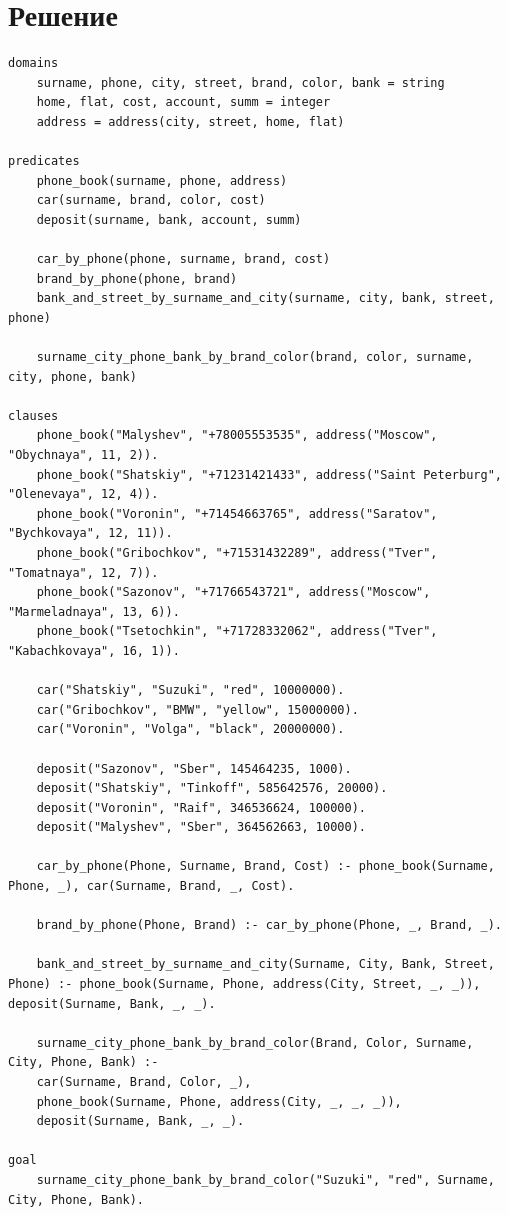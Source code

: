 \documentclass[12pt]{report}
\begin{document}
\newpage
\section*{Решение}
\begin{lstlisting}
domains
	surname, phone, city, street, brand, color, bank = string
	home, flat, cost, account, summ = integer
	address = address(city, street, home, flat)
		
predicates
	phone_book(surname, phone, address)
	car(surname, brand, color, cost)
	deposit(surname, bank, account, summ)
	
	car_by_phone(phone, surname, brand, cost)
	brand_by_phone(phone, brand)
	bank_and_street_by_surname_and_city(surname, city, bank, street, phone)
	
	surname_city_phone_bank_by_brand_color(brand, color, surname, city, phone, bank)
		
clauses
	phone_book("Malyshev", "+78005553535", address("Moscow", "Obychnaya", 11, 2)).
	phone_book("Shatskiy", "+71231421433", address("Saint Peterburg", "Olenevaya", 12, 4)).
	phone_book("Voronin", "+71454663765", address("Saratov", "Bychkovaya", 12, 11)).
	phone_book("Gribochkov", "+71531432289", address("Tver", "Tomatnaya", 12, 7)).
	phone_book("Sazonov", "+71766543721", address("Moscow", "Marmeladnaya", 13, 6)).
	phone_book("Tsetochkin", "+71728332062", address("Tver", "Kabachkovaya", 16, 1)).
	
	car("Shatskiy", "Suzuki", "red", 10000000).
	car("Gribochkov", "BMW", "yellow", 15000000).
	car("Voronin", "Volga", "black", 20000000).
	
	deposit("Sazonov", "Sber", 145464235, 1000).
	deposit("Shatskiy", "Tinkoff", 585642576, 20000).
	deposit("Voronin", "Raif", 346536624, 100000).
	deposit("Malyshev", "Sber", 364562663, 10000).
	
	car_by_phone(Phone, Surname, Brand, Cost) :- phone_book(Surname, Phone, _), car(Surname, Brand, _, Cost).
	
	brand_by_phone(Phone, Brand) :- car_by_phone(Phone, _, Brand, _).
	
	bank_and_street_by_surname_and_city(Surname, City, Bank, Street, Phone) :- phone_book(Surname, Phone, address(City, Street, _, _)), deposit(Surname, Bank, _, _).
	
	surname_city_phone_bank_by_brand_color(Brand, Color, Surname, City, Phone, Bank) :-
	car(Surname, Brand, Color, _),
	phone_book(Surname, Phone, address(City, _, _, _)),
	deposit(Surname, Bank, _, _).
	
goal
	surname_city_phone_bank_by_brand_color("Suzuki", "red", Surname, City, Phone, Bank).
\end{lstlisting}
\end{document}
